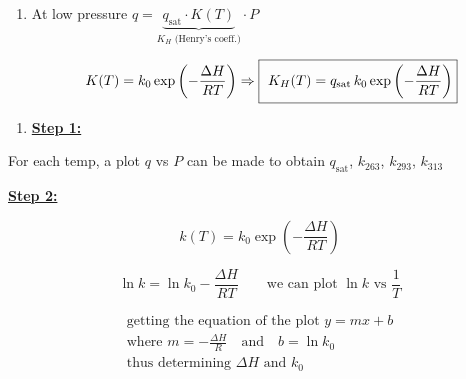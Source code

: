 \documentclass{article}
\begin{document}
\begin{enumerate}
    \vspace{0.3cm}
    \item[\textbf{3.}] At low pressure \quad $\displaystyle q = \underbrace{q_{\text{sat}} \cdot K(T)}_{K_H \text{ (Henry's coeff.)}} \cdot P$

    \vspace{0.3cm}
    \begin{equation*}
        K(T) = k_0 \exp\left(-\frac{\Delta H}{RT}\right) \Rightarrow \text{\fbox{\rule[-0.3cm]{0cm}{0.8cm} $\displaystyle K_H(T) = q_{\text{sat}} \, k_0 \exp\left(-\frac{\Delta H}{RT}\right)$}}
    \end{equation*}
\end{enumerate}

\newpage

\begin{enumerate}
    \item[\textbf{4.}] \underline{\textbf{Step 1:}}
\end{enumerate}

\vspace{0.2cm}
\hspace{0.5cm} For each temp, a plot $q$ vs $P$ can be made to obtain $q_{\text{sat}}$, $k_{263}$, $k_{293}$, $k_{313}$


\vspace{0.5cm}
\underline{\textbf{Step 2:}}

\vspace{0.3cm}
\begin{equation*}
    k(T) = k_0 \exp\left(-\frac{\Delta H}{RT}\right)
\end{equation*}

\begin{equation*}
    \ln k = \ln k_0 - \frac{\Delta H}{RT} \qquad \text{we can plot } \ln k \text{ vs } \frac{1}{T}
\end{equation*}

\vspace{0.3cm}
\hfill
\begin{minipage}[c]{0.5\textwidth}
    \begin{gather*}
        \text{getting the equation of the plot } y = mx + b \\
        \text{where } m = -\frac{\Delta H}{R} \quad \text{and} \quad b = \ln k_0 \\
        \text{thus determining } \Delta H \text{ and } k_0
    \end{gather*}
\end{minipage}
\end{document}
